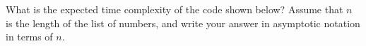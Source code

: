\begin{prob}
    What is the expected time complexity of the code shown below?
    Assume that $n$ is the length of the list of numbers, and write your
    answer in asymptotic notation in terms of $n$.

    \inputminted{python}{\thisdir/code.py}


\end{prob}
